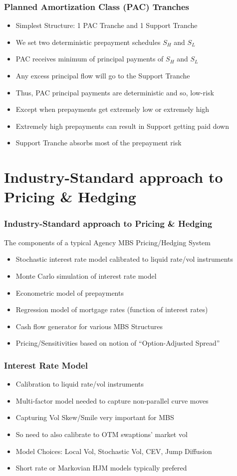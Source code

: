 \documentclass{beamer}
\begin{document}
\begin{frame}
\frametitle{Planned Amortization Class (PAC) Tranches}
\begin{itemize}
\item Simplest Structure: 1 PAC Tranche and 1 Support Tranche
\item We set two deterministic prepayment schedules $S_H$ and $S_L$
\item PAC receives minimum of principal payments of $S_H$ and $S_L$
\item Any excess principal flow will go to the Support Tranche
\item Thus, PAC principal payments are deterministic and so, low-risk
\item Except when prepayments get extremely low or extremely high
\item Extremely high prepayments can result in Support getting paid down
\item Support Tranche absorbs most of the prepayment risk
\end{itemize}
\end{frame}

\section{Industry-Standard approach to Pricing \& Hedging}

\begin{frame}
\frametitle{Industry-Standard approach to Pricing \& Hedging}
The components of a typical Agency MBS Pricing/Hedging System
\begin{itemize}
\item Stochastic interest rate model calibrated to liquid rate/vol instruments
\item Monte Carlo simulation of interest rate model
\item Econometric model of prepayments
\item Regression model of mortgage rates (function of interest rates)
\item Cash flow generator for various MBS Structures
\item Pricing/Sensitivities based on notion of ``Option-Adjusted Spread''
\end{itemize}
\end{frame}


\begin{frame}
\frametitle{Interest Rate Model}
\begin{itemize}
\item Calibration to liquid rate/vol instruments
\item Multi-factor model needed to capture non-parallel curve moves
\item Capturing Vol Skew/Smile very important for MBS
\item So need to also calibrate to OTM swaptions' market vol
\item Model Choices: Local Vol, Stochastic Vol, CEV, Jump Diffusion
\item Short rate or Markovian HJM models typically prefered
\end{itemize}
\end{frame}
\end{document}
